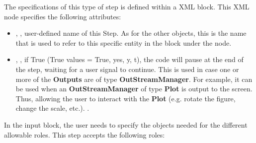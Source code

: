 The specifications of this type of step is defined within a 
 XML block.
%
This XML node specifies the following attributes:
\vspace{-5mm}
\begin{itemize}
\itemsep0em
\item {}, , user-defined name of
  this Step. 
  \nb As for the other objects, this is the name that is used to refer to
  this specific entity in the  block under the 
   node.
\item {}, , if True
  (True values = True, yes, y, t), the code will pause at the end of
  the step, waiting for a user signal to continue. This is used in case one or
  more of the \textbf{Outputs} are of type \textbf{OutStreamManager}.
  For example, it can be used when an \textbf{OutStreamManager} of type
  \textbf{Plot} is output to the screen. Thus, allowing the user to interact
  with the \textbf{Plot} (e.g. rotate the figure, change the scale, etc.).
  .
\end{itemize}
\vspace{-5mm}
In the  input block, the user needs to specify the objects
needed for the different allowable roles.
%
This step accepts the following roles:

